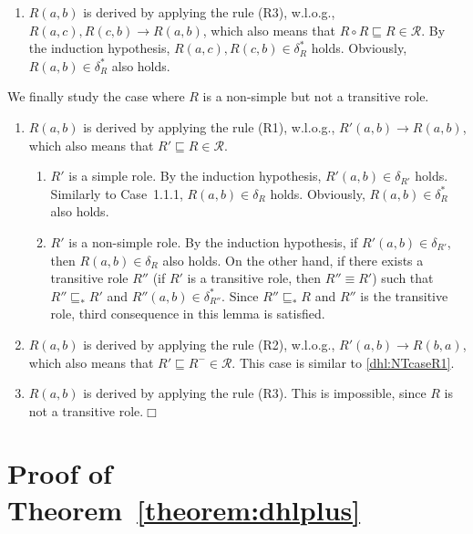 \begin{enumerate}[leftmargin=12ex,label=Case~2.\arabic*, ref=Case~2.\arabic*]
\item $R(a,b)$ is derived by applying the rule (R3), w.l.o.g., $R(a,c),R(c,b)\rightarrow R(a,b)$,
    which also means that $R\circ R\sqsubseteq R\in\mathcal{R}$. By the induction hypothesis,
    $R(a,c),R(c,b)\in\delta_{R}^*$ holds. Obviously, $R(a,b)\in\delta_{R}^*$ also holds.
\end{enumerate}

We finally study the case where $R$ is a non-simple but not a transitive role.

\begin{enumerate}[leftmargin=12ex,label=Case~3.\arabic*, ref=Case~3.\arabic*]
\item $R(a,b)$ is derived by applying the rule (R1), w.l.o.g., $R'(a,b)\rightarrow R(a,b)$,
    which also means that $R'\sqsubseteq R\in\mathcal{R}$.\label{dhl:NTcaseR1}
    \begin{enumerate}[leftmargin=8ex,label=Case~3.1.\arabic*]
    \item $R'$ is a simple role. By the induction hypothesis, $R'(a,b)\in\delta_{R'}$ holds.
        Similarly to Case~1.1.1, $R(a,b)\in\delta_{R}$ holds.
        Obviously, $R(a,b)\in\delta_{R}^*$ also holds.

    \item $R'$ is a non-simple role. By the induction hypothesis, if $R'(a,b)\in\delta_{R'}$,
        then $R(a,b)\in\delta_R$ also holds. On the other hand, if there exists a transitive role
        $R''$ (if $R'$ is a transitive role, then $R''\equiv R'$) such that
        $R''\sqsubseteq_* R'$ and $R''(a,b)\in\delta_{R''}^*$. Since $R''\sqsubseteq_* R$ and
        $R''$ is the transitive role, third consequence in this lemma is satisfied.
    \end{enumerate}

\item $R(a,b)$ is derived by applying the rule (R2), w.l.o.g., $R'(a,b)\rightarrow R(b,a)$,
    which also means that $R'\sqsubseteq R^-\in\mathcal{R}$. This case is similar to \ref{dhl:NTcaseR1}.

\item $R(a,b)$ is derived by applying the rule (R3). This is impossible, since $R$ is not a transitive
    role.\hfill$\Box$
\end{enumerate}


\section{Proof of Theorem~\ref{theorem:dhlplus}}

